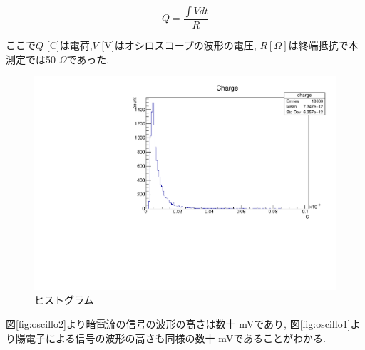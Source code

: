 \begin{equation}
Q = \frac{\int Vdt}{R}
\label{eq:charge}
\end{equation}

ここで$Q$ [C]は電荷,$V$ [V]はオシロスコープの波形の電圧,
$R [\Omega]$は終端抵抗で本測定では50 $\Omega$であった.

\begin{figure}[htbp]
\centering
\includegraphics[keepaspectratio,angle=270,scale=0.7]{fig/ybm/charge.pdf}
\caption{ヒストグラム}
\label{fig:charge}
\end{figure}


図\ref{fig:oscillo2}より暗電流の信号の波形の高さは数十 mVであり,
図\ref{fig:oscillo1}より陽電子による信号の波形の高さも同様の数十 mVであることがわかる.


